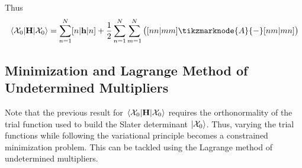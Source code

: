\documentclass[12pt,a4paper,titlepage]{article}
\newcommand{\Chi}{\mathcal{X}} %
\begin{document}
\newpage
Thus
\begin{equation}
\mel{\Chi_{0}}{\vb{H}}{\Chi_{0}}=\sum_{n=1}^{N}[n|\vb{h}|n]+\frac{1}{2}\sum_{n=1}^{N}\sum_{m=1}^{N}\big([nn|mm]\tikzmarknode{A}{-}[nm|mn]\big)
\end{equation}
\subsection{Minimization and Lagrange Method of Undetermined Multipliers}
Note that the previous result for $\mel{\Chi_{0}}{\vb{H}}{\Chi_{0}}$ requires the orthonormality of the trial function used to build the Slater determinant $\ket{\Chi_{0}}$. Thus, varying the trial functions while following the variational principle becomes a constrained minimization problem. This can be tackled using the Lagrange method of undetermined multipliers.\\
\end{document}
